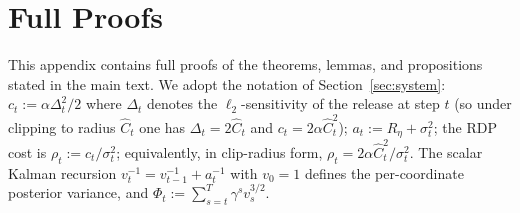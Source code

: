 \documentclass{article}
\begin{document}
\medskip












\appendix


\section{Full Proofs}

This appendix contains full proofs of the theorems, lemmas, and propositions stated in the main text. We adopt the notation of Section~\ref{sec:system}: $c_t := \alpha \Delta_t^2/2$ where $\Delta_t$ denotes the $\ell_2$-sensitivity of the release at step $t$ (so under clipping to radius $\hat C_t$ one has $\Delta_t = 2\hat C_t$ and $c_t = 2\alpha\hat C_t^2$); $a_t := R_\eta + \sigma_t^2$; the RDP cost is $\rho_t := c_t/\sigma_t^2$; equivalently, in clip-radius form, $\rho_t = 2\alpha\hat C_t^2/\sigma_t^2$. The scalar Kalman recursion $v_t^{-1} = v_{t-1}^{-1} + a_t^{-1}$ with $v_0 = 1$ defines the per-coordinate posterior variance, and $\Phi_t := \sum_{s=t}^T \gamma^s v_s^{3/2}$.
\end{document}
